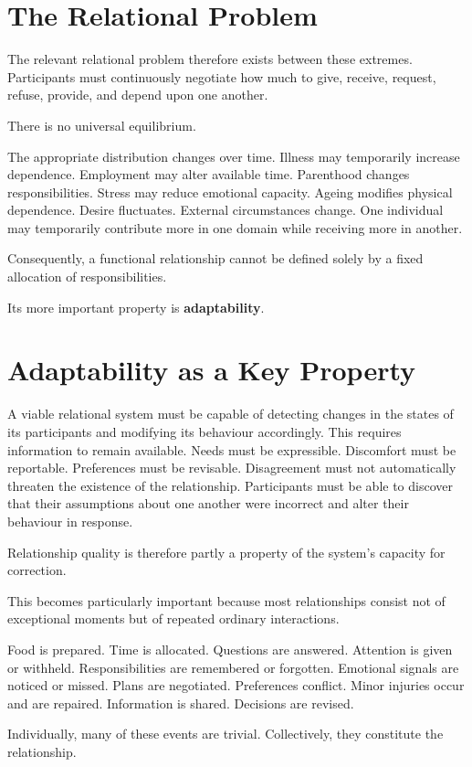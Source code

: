 \documentclass[11pt, a4paper]{article}
\begin{document}
\section*{The Relational Problem}
The relevant relational problem therefore exists between these extremes. Participants must continuously negotiate how much to give, receive, request, refuse, provide, and depend upon one another.

There is no universal equilibrium.

The appropriate distribution changes over time. Illness may temporarily increase dependence. Employment may alter available time. Parenthood changes responsibilities. Stress may reduce emotional capacity. Ageing modifies physical dependence. Desire fluctuates. External circumstances change. One individual may temporarily contribute more in one domain while receiving more in another.

Consequently, a functional relationship cannot be defined solely by a fixed allocation of responsibilities.

Its more important property is \textbf{adaptability}.

\section*{Adaptability as a Key Property}
A viable relational system must be capable of detecting changes in the states of its participants and modifying its behaviour accordingly. This requires information to remain available. Needs must be expressible. Discomfort must be reportable. Preferences must be revisable. Disagreement must not automatically threaten the existence of the relationship. Participants must be able to discover that their assumptions about one another were incorrect and alter their behaviour in response.

Relationship quality is therefore partly a property of the system's capacity for correction.

This becomes particularly important because most relationships consist not of exceptional moments but of repeated ordinary interactions.

Food is prepared. Time is allocated. Questions are answered. Attention is given or withheld. Responsibilities are remembered or forgotten. Emotional signals are noticed or missed. Plans are negotiated. Preferences conflict. Minor injuries occur and are repaired. Information is shared. Decisions are revised.

Individually, many of these events are trivial. Collectively, they constitute the relationship.
\end{document}
